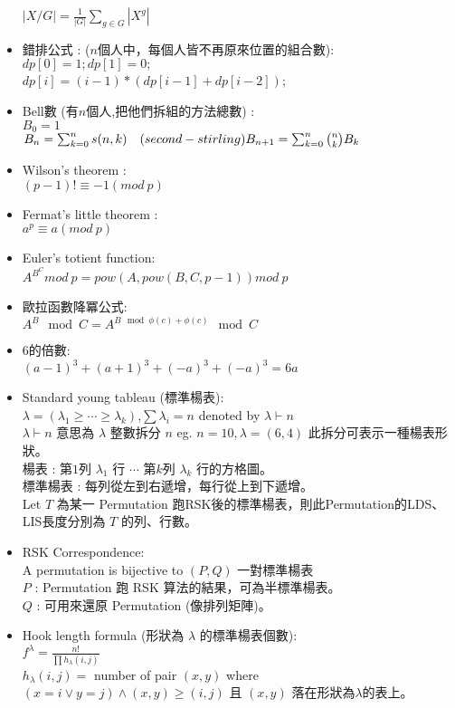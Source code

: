 \begin{itemize}
      $|X/G| = \frac{1}{|G|}\sum\limits_{g\in G} |X^g|$
    \item 錯排公式 :  ($n$個人中，每個人皆不再原來位置的組合數): \\
      $dp[0]=1;dp[1]=0;$\\
      $dp[i]=(i-1)*(dp[i-1]+dp[i-2])$;
    \item Bell數 (有$n$個人,把他們拆組的方法總數) : \\
      $B_0= 1$\\
      $B_n= \sum_{k=0}^{n} s(n,k)\quad (second-stirling)\\
      B_{n+1}= \sum_{k=0}^{n}{n \choose k} B_k$
    \item Wilson's theorem :\\
      $(p-1)! \equiv -1 (mod \ p)$
    \item Fermat's little theorem :\\
      $a^p \equiv a (mod \ p)$
    \item Euler's totient function:\\
      $ A ^ {B ^ C} mod \ p = pow(A,pow(B,C,p-1)) mod \ p$
    \item 歐拉函數降冪公式:\\
      $A^B \mod C=A^{B \mod \phi(c) + \phi(c)}\mod C$
    \item 6的倍數: \\
     $(a-1)^3 + (a+1)^3 + (-a)^3 + (-a)^3 = 6a$
    \item Standard young tableau (標準楊表): \\
      $\lambda=(\lambda _{1}\geq \cdots \geq \lambda _{k})$,$\sum \lambda _{i} = n$ denoted by $\lambda \vdash n$\\
      $\lambda \vdash n$ 意思為 $\lambda$ 整數拆分 $n$ eg. $n = 10,\lambda = (6,4)$ 此拆分可表示一種楊表形狀。\\
      楊表 : 第$1$列 $\lambda _{1}$ 行 $\cdots$ 第$k$列 $\lambda_{k}$ 行的方格圖。\\
      標準楊表 : 每列從左到右遞增，每行從上到下遞增。 \\
      Let $T$ 為某一 Permutation 跑RSK後的標準楊表，則此Permutation的LDS、LIS長度分別為 $T$ 的列、行數。 
    \item RSK Correspondence: \\
      A permutation is bijective to $(P,Q)$ 一對標準楊表 \\
      $P$ : Permutation 跑 RSK 算法的結果，可為半標準楊表。 \\
      $Q$ : 可用來還原 Permutation (像排列矩陣)。 
    \item Hook length formula (形狀為 $\lambda$ 的標準楊表個數): \\
      $f^{\lambda }={\frac {n!}{\prod h_{\lambda }(i,j)}}$ \\
      $h_{\lambda }(i,j)=$ number of pair $(x,y)$ where $(x = i \lor y = j) \land (x,y) \geq (i,j)$ 且 $(x,y)$ 落在形狀為$\lambda$的表上。

\end{itemize}